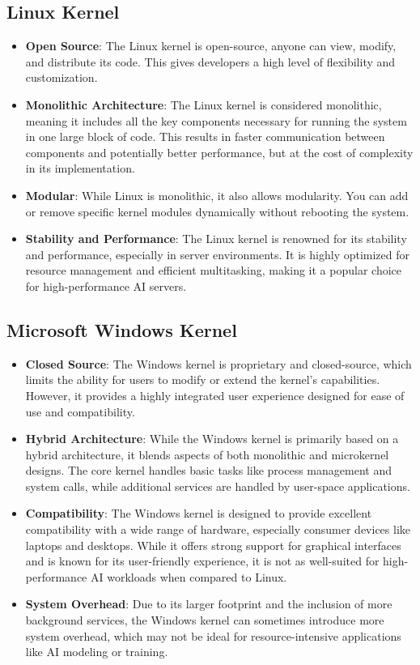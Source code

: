 \subsection{Linux Kernel}
\begin{itemize}
    \item \textbf{Open Source}: The Linux kernel is open-source, anyone can view, modify, and distribute its code. This gives developers a high level of flexibility and customization.
    \item \textbf{Monolithic Architecture}: The Linux kernel is considered monolithic, meaning it includes all the key components necessary for running the system in one large block of code. This results in faster communication between components and potentially better performance, but at the cost of complexity in its implementation.
    \item \textbf{Modular}: While Linux is monolithic, it also allows modularity. You can add or remove specific kernel modules dynamically without rebooting the system.
    \item \textbf{Stability and Performance}: The Linux kernel is renowned for its stability and performance, especially in server environments. It is highly optimized for resource management and efficient multitasking, making it a popular choice for high-performance AI servers.
\end{itemize}

\subsection{Microsoft Windows Kernel}
\begin{itemize}
    \item \textbf{Closed Source}: The Windows kernel is proprietary and closed-source, which limits the ability for users to modify or extend the kernel's capabilities. However, it provides a highly integrated user experience designed for ease of use and compatibility.
    \item \textbf{Hybrid Architecture}: While the Windows kernel is primarily based on a hybrid architecture, it blends aspects of both monolithic and microkernel designs. The core kernel handles basic tasks like process management and system calls, while additional services are handled by user-space applications.
    \item \textbf{Compatibility}: The Windows kernel is designed to provide excellent compatibility with a wide range of hardware, especially consumer devices like laptops and desktops. While it offers strong support for graphical interfaces and is known for its user-friendly experience, it is not as well-suited for high-performance AI workloads when compared to Linux.
    \item \textbf{System Overhead}: Due to its larger footprint and the inclusion of more background services, the Windows kernel can sometimes introduce more system overhead, which may not be ideal for resource-intensive applications like AI modeling or training.
\end{itemize}

